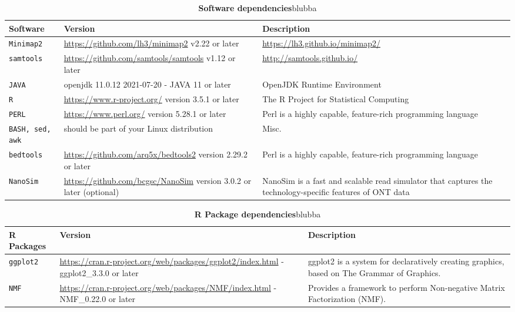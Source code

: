 \documentclass[times, 11pt, a4paper]{article}
\begin{document}
\begin{table}[]
\label{tab:software}
\begin{tabular}{|p{1.5cm}|p{7cm}|p{6.5cm}|}
\hline 
            Software & Version & Description \\ 
            \hline \hline
            \texttt{Minimap2} & \url{https://github.com/lh3/minimap2} v2.22 or later & \url{https://lh3.github.io/minimap2/} \\ \hline
            \texttt{samtools} & \url{https://github.com/samtools/samtools} v1.12 or later & \url{http://samtools.github.io/} \\ \hline
	   \texttt{JAVA} & openjdk 11.0.12 2021-07-20 - JAVA 11 or later & OpenJDK Runtime Environment\\ \hline
	   \texttt{R} &  \url{https://www.r-project.org/} version 3.5.1 or later & The R Project for Statistical Computing \\ \hline
	   \texttt{PERL} &  \url{https://www.perl.org/} version 5.28.1 or later & Perl is a highly capable, feature-rich programming language \\ \hline
	   \texttt{BASH, sed, awk} &  should be part of your Linux distribution & Misc.\\ \hline
	   \texttt{bedtools} &  \url{https://github.com/arq5x/bedtools2} version 2.29.2 or later & Perl is a highly capable, feature-rich programming language \\ \hline	   
	   \texttt{NanoSim} &  \url{https://github.com/bcgsc/NanoSim} version 3.0.2 or later (optional) & NanoSim is a fast and scalable read simulator that captures the technology-specific features of ONT data\\ \hline	   
\end{tabular}
\caption{\textbf{Software dependencies}\label{tab:software} blubba}
\end{table}

\begin{table}[]
\label{tab:packages}
\begin{tabular}{|p{1.5cm}|p{7cm}|p{6.5cm}|}
\hline 
            R Packages & Version & Description \\ 
            \hline \hline
            \texttt{ggplot2} & \url{https://cran.r-project.org/web/packages/ggplot2/index.html} - ggplot2\_3.3.0 or later &  ggplot2 is a system for declaratively creating graphics, based on The Grammar of Graphics. \\ \hline
            \texttt{NMF} & \url{https://cran.r-project.org/web/packages/NMF/index.html} - NMF\_0.22.0 or later &  Provides a framework to perform Non-negative Matrix Factorization (NMF). \\ \hline
\end{tabular}
\caption{\textbf{R Package dependencies}\label{tab:software} blubba}
\end{table}
\end{document}
